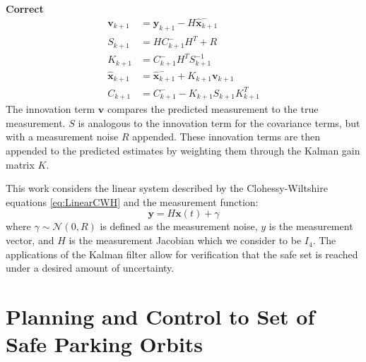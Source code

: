 \documentclass[twocolumn,letterpaper]{IEEEAerospaceCLS}  %
\theoremstyle{definition}
\begin{document}
\textbf{Correct}
\begin{equation}\label{eq: correct_kalman}
\begin{split}
\boldsymbol{v}_{k+1} &= \boldsymbol{y}_{k+1} - H\hat{\boldsymbol{x}}^-_{k+1}\\
S_{k+1} &= H C^-_{k+1} H^T + R\\
K_{k+1} &= C^-_{k+1}H^TS^{-1}_{k+1}\\
\hat{\boldsymbol{x}}_{k+1} &= \hat{\boldsymbol{x}}^-_{k+1} + K_{k+1}\boldsymbol{v}_{k+1}\\
C_{k+1} &= C^-_{k+1} - K_{k+1}S_{k+1}K^T_{k+1}
\end{split}
\end{equation}
The innovation term $\boldsymbol{v}$ compares the predicted measurement to the true measurement. 
$S$ is analogous to the innovation term for the covariance terms, but with a measurement noise $R$ appended. 
These innovation terms are then appended to the predicted estimates by weighting them through the Kalman gain matrix $K$.

This work considers the linear system described by the Clohessy-Wiltshire equations \eqref{eq:LinearCWH} and the measurement function:
%
\begin{equation}\label{eq: measurement}
\boldsymbol{y} = H \boldsymbol{x}(t) + \gamma 
\end{equation}
%
where $\gamma \sim \mathcal{N}$$(0,R)$ is defined as the measurement noise, $y$ is the measurement vector, and $H$ is the measurement Jacobian which we consider to be $I_{4}$. 
The applications of the Kalman filter allow for verification that the safe set is reached under a desired amount of uncertainty.


\section{Planning and Control to Set of Safe Parking Orbits} \label{sec: planning and control to safe parking orbits set}
\end{document}
